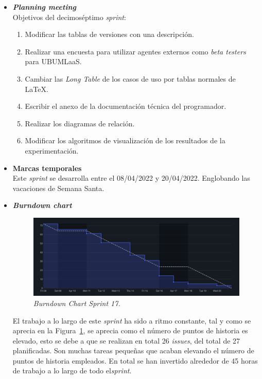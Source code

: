 \begin{itemize}
\item \textbf{\textit{Planning meeting}}\\
Objetivos del decimoséptimo \textit{sprint}:
\begin{enumerate}
\item Modificar las tablas de versiones con una descripción.
\item Realizar una encuesta para utilizar agentes externos como \textit{beta testers} para UBUMLaaS.
\item Cambiar las \textit{Long Table} de los casos de uso por tablas normales de \LaTeX.
\item Escribir el anexo de la documentación técnica del programador.
\item Realizar los diagramas de relación.
\item Modificar los algoritmos de visualización de los resultados de la experimentación.
\end{enumerate}

\item \textbf{Marcas temporales}\\
Este \textit{sprint} se desarrolla entre el 08/04/2022 y 20/04/2022. Englobando las vacaciones de Semana Santa.

\item \textbf{\textit{Burndown chart}}\\
\begin{figure}
\begin{center}
\includegraphics[width=\textwidth]{../img/anexos/sprints/BD-Sprint17}
\caption{\textit{Burndown Chart Sprint 17.}}\label{fig:BD-Sprint17}
\end{center}
\end{figure}
El trabajo a lo largo de este \textit{sprint} ha sido a ritmo constante, tal y como se aprecia en la Figura~\ref{fig:BD-Sprint17}, se aprecia como el número de puntos de historia es elevado, esto se debe a que se realizan en total 26 \textit{issues}, del total de 27 planificadas. Son muchas tareas pequeñas que acaban elevando el número de puntos de historia empleados. En total se han invertido alrededor de 45 horas de trabajo a lo largo de todo el\textit{sprint}.


\end{itemize}
